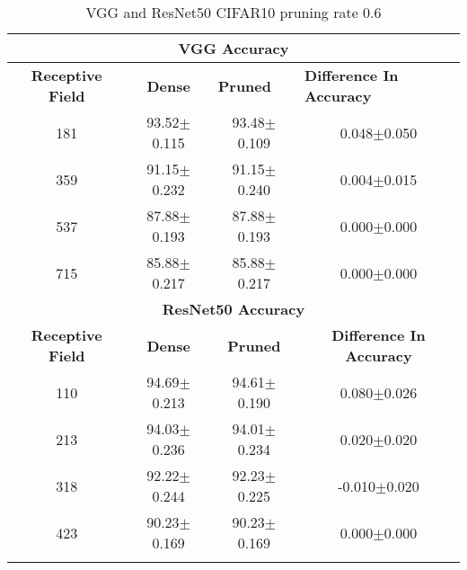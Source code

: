 \begin{table}[H]
  \centering
\begin{tabular}{@{}cccc@{}}
\toprule
\multicolumn{4}{c}{\textbf{VGG Accuracy}}                                                                                                                                  \\ \midrule
\textbf{Receptive Field} & \textbf{Dense} & \multicolumn{1}{l}{\textbf{Pruned}} & \multicolumn{1}{l}{\textbf{Difference In Accuracy}} \\ \midrule
181                      & 93.52$\pm$0.115              & 93.48$\pm$0.109                                   & 0.048$\pm$0.050                                     \\
359                      & 91.15$\pm$0.232              & 91.15$\pm$0.240                                   & 0.004$\pm$0.015                                     \\
537                      & 87.88$\pm$0.193              & 87.88$\pm$0.193                                   & 0.000$\pm$0.000                                     \\
715                      & 85.88$\pm$0.217              & 85.88$\pm$0.217                                   & 0.000$\pm$0.000                                     \\ \midrule
\multicolumn{4}{c}{\textbf{ResNet50 Accuracy}}                                                                                                                             \\ \midrule
\textbf{Receptive Field} & \textbf{Dense} & \textbf{Pruned}                     & \textbf{Difference In Accuracy}                     \\
110                      & 94.69$\pm$0.213              & 94.61$\pm$0.190                                   & 0.080$\pm$0.026                                     \\
213                      & 94.03$\pm$0.236              & 94.01$\pm$0.234                                   & 0.020$\pm$0.020                                     \\
318                      & 92.22$\pm$0.244              & 92.23$\pm$0.225                                   & -0.010$\pm$0.020                                    \\
423                      & 90.23$\pm$0.169              & 90.23$\pm$0.169                                   &
0.000$\pm$0.000                                     \\ \bottomrule \\
\end{tabular}
\caption{VGG and ResNet50 CIFAR10 pruning rate 0.6}
\label{tab:cifar10 pruning rate06}
\end{table}




